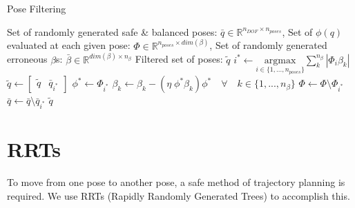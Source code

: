 \documentclass[letterpaper, 10pt, conference]{ieeeconf}
\begin{document}
\begin{algorithm}
    \caption{Pose Filtering}
    \begin{algorithmic}[1]
        \renewcommand{\algorithmicrequire}{\textbf{Input:}}
        \renewcommand{\algorithmicensure}{\textbf{Output:}}
        \REQUIRE Set of randomly generated safe \& balanced poses: $\bar{q} \in
        \mathbb{R}^{n_{DOF} \times n_{poses}}$,
        \newline Set of $\phi(q)$ evaluated at each given pose: $\Phi \in
        \mathbb{R}^{n_{poses} \times dim(\beta)}$,
        \newline Set of randomly generated erroneous $\beta$s: $\bar{\beta} \in \mathbb{R}^{dim(\beta)
        \times n_{\beta}}$
        \ENSURE Filtered set of poses: $\widetilde{q}$
        \REPEAT
        \STATE $i^* \leftarrow \underset{i \in \{1, ..., n_{poses}\}}{\mathrm{argmax}}
        \sum_{k}^{n_{\beta}} | \Phi_i \beta_k |$
        \STATE $\widetilde{q} \leftarrow [\begin{matrix} \widetilde{q} &
        \bar{q}_{i^*} \end{matrix}] $
        \STATE $\phi^* \leftarrow \Phi_{i^{*}}$
        \STATE $\beta_k \leftarrow \beta_k - (\eta \; \phi^* \beta_k) \phi^* \quad \forall \quad k \in \{1, ..., n_\beta \}$
        \STATE $\Phi \leftarrow  \Phi \setminus \Phi_{i^*} $
        \STATE $\bar{q} \leftarrow \bar{q} \setminus \bar{q}_{i^*} $
        \RETURN $\widetilde{q}$
    \end{algorithmic}
\end{algorithm}

\section{RRTs}

To move from one pose to another pose, a safe method of trajectory planning is
required. We use RRTs (Rapidly Randomly Generated Trees) to accomplish this.
\end{document}
